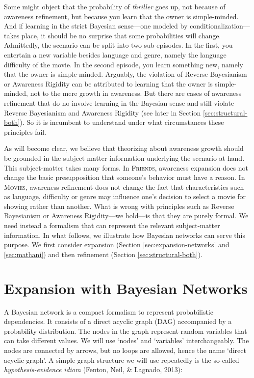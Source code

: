 \documentclass[
  11pt,
  dvipsnames,enabledeprecatedfontcommands]{scrartcl}
\begin{document}
Some might object that the probability of \textit{thriller} goes up, not
because of awareness refinement, but because you learn that the owner is
simple-minded. And if learning in the strict Bayesian sense---one
modeled by conditionalization---takes place, it should be no surprise
that some probabilities will change. Admittedly, the scenario can be
split into two sub-episodes. In the first, you entertain a new variable
besides language and genre, namely the language difficulty of the movie.
In the second episode, you learn something new, namely that the owner is
simple-minded. Arguably, the violation of Reverse Bayesianism or
Awareness Rigidity can be attributed to learning that the owner is
simple-minded, not to the mere growth in awareness. But there are cases
of awareness refinement that do no involve learning in the Bayesian
sense and still violate Reverse Bayesianism and Awareness Rigidity (see
later in Section \ref{sec:structural-both}). So it is incumbent to
understand under what circumstances these principles fail.

As will become clear, we believe that theorizing about awareness growth
should be grounded in the subject-matter information underlying the
scenario at hand. This subject-matter takes many forms. In
\textsc{Friends}, awareness expansion does not change the basic
presupposition that someone's behavior must have a reason. In
\textsc{Movies}, awareness refinement does not change the fact that
characteristics such as language, difficulty or genre may influence
one's decision to select a movie for showing rather than another. What
is wrong with principles such as Reverse Bayesianism or Awareness
Rigidity---we hold---is that they are purely formal. We need instead a
formalism that can represent the relevant subject-matter information. In
what follows, we illustrate how Bayesian networks can serve this
purpose. We first consider expansion (Section
\ref{sec:expansion-networks} and \ref{sec:mathani}) and then refinement
(Section \ref{sec:structural-both}).

\hypertarget{expansion-with-bayesian-networks}{%
\section{Expansion with Bayesian
Networks}\label{expansion-with-bayesian-networks}}

\label{sec:expansion-networks}

A Bayesian network is a compact formalism to represent probabilistic
dependencies. It consists of a direct acyclic graph (DAG) accompanied by
a probability distribution. The nodes in the graph represent random
variables that can take different values. We will use `nodes' and
`variables' interchangeably. The nodes are connected by arrows, but no
loops are allowed, hence the name `direct acyclic graph'. A simple graph
structure we will use repeatedly is the so-called
\emph{hypothesis-evidence idiom} (Fenton, Neil, \& Lagnado, 2013):
\end{document}
